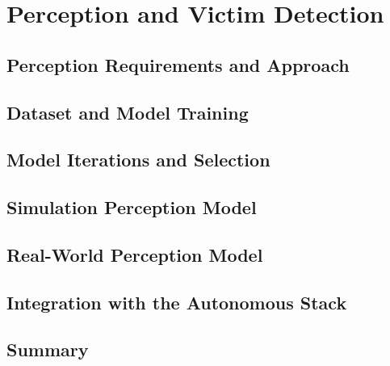
\chapter{Perception and Victim Detection}
\label{chap:perception}


\section{Perception Requirements and Approach}
\label{sec:perception_requirements}

\section{Dataset and Model Training}
\label{sec:perception_dataset}

\section{Model Iterations and Selection}
\label{sec:perception_models}

\section{Simulation Perception Model}
\label{sec:perception_sim}

\section{Real-World Perception Model}
\label{sec:perception_real}

\section{Integration with the Autonomous Stack}
\label{sec:perception_integration}

\section{Summary}
\label{sec:perception_summary}
